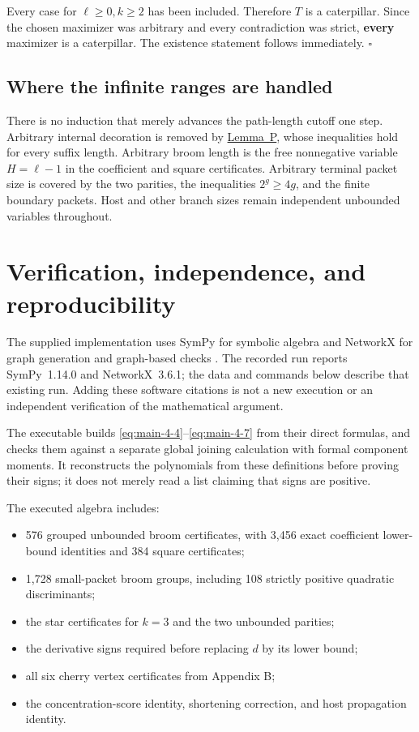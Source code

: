 \documentclass[11pt,letterpaper]{article}
\providecommand{\tightlist}{\setlength{\itemsep}{0.12em}\setlength{\parskip}{0pt}}
\theoremstyle{plain}
\begin{document}
Every case for \(\ell\ge0,k\ge2\) has been included. Therefore \(T\) is a caterpillar. Since the chosen maximizer was arbitrary and every contradiction was strict, \textbf{every} maximizer is a caterpillar. The existence statement follows immediately. \hfill\(\square\)

\subsection*{Where the infinite ranges are handled}\label{where-the-infinite-ranges-are-handled}

There is no induction that merely advances the path-length cutoff one step. Arbitrary internal decoration is removed by \hyperref[lem:packet]{Lemma~P}, whose inequalities hold for every suffix length. Arbitrary broom length is the free nonnegative variable \(H=\ell-1\) in the coefficient and square certificates. Arbitrary terminal packet size is covered by the two parities, the inequalities \(2^g\ge4g\), and the finite boundary packets. Host and other branch sizes remain independent unbounded variables throughout.

\section{Verification, independence, and reproducibility}\label{verification-independence-and-reproducibility}
The supplied implementation uses SymPy for symbolic algebra \cite{MeurerEtAl2017} and NetworkX for graph generation and graph-based checks \cite{HagbergSchultSwart2008}. The recorded run reports SymPy~1.14.0 and NetworkX~3.6.1; the data and commands below describe that existing run. Adding these software citations is not a new execution or an independent verification of the mathematical argument.


The executable  builds \eqref{eq:main-4-4}--\eqref{eq:main-4-7} from their direct formulas, and checks them against a separate global joining calculation with formal component moments. It reconstructs the polynomials from these definitions before proving their signs; it does not merely read a list claiming that signs are positive.

The executed algebra includes:

\begin{itemize}
\tightlist
\item
  576 grouped unbounded broom certificates, with 3,456 exact coefficient lower-bound identities and 384 square certificates;
\item
  1,728 small-packet broom groups, including 108 strictly positive quadratic discriminants;
\item
  the star certificates for \(k=3\) and the two unbounded parities;
\item
  the derivative signs required before replacing \(d\) by its lower bound;
\item
  all six cherry vertex certificates from Appendix B;
\item
  the concentration-score identity, shortening correction, and host propagation identity.
\end{itemize}
\end{document}
